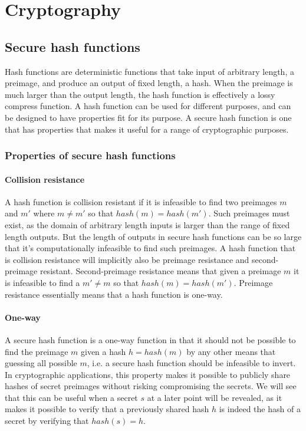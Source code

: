 \section{Cryptography}
\label{sec:cryptography}

\subsection{Secure hash functions}

Hash functions are deterministic functions that take input of arbitrary length, a preimage, and produce an output of fixed length, a hash. When the preimage is much larger than the output length, the hash function is effectively a lossy compress function. A hash function can be used for different purposes, and can be designed to have properties fit for its purpose. A secure hash function is one that has properties that makes it useful for a range of cryptographic purposes. 

\subsubsection{Properties of secure hash functions}

\paragraph{Collision resistance}
A hash function is collision resistant if it is infeasible to find two preimages $m$ and $m'$ where $m \neq m'$ so that $hash(m) = hash(m')$. Such preimages must exist, as the domain of arbitrary length inputs is larger than the range of fixed length outputs. But the length of outputs in secure hash functions can be so large that it's computationally infeasible to find such preimages. 
A hash function that is collision resistance will implicitly also be preimage resistance and second-preimage resistant. Second-preimage resistance means that given a preimage $m$ it is infeasible to find a $m' \neq m$ so that $hash(m) = hash(m')$. Preimage resistance essentially means that a hash function is one-way.

\paragraph{One-way}
A secure hash function is a one-way function in that it should not be possible to find the preimage $m$ given a hash $h = hash(m)$ by any other means that guessing all possible $m$, i.e. a secure hash function should be infeasible to invert. In cryptographic applications, this property makes it possible to publicly share hashes of secret preimages without risking compromising the secrets. We will see that this can be useful when a secret $s$ at a later point will be revealed, as it makes it possible to verify that a previously shared hash $h$ is indeed the hash of a secret by verifying that $hash(s) = h$.

